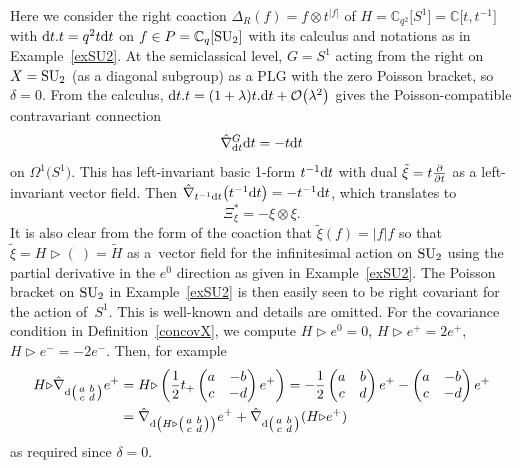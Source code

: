 \documentclass[pdftex]{sigma}
\numberwithin{equation}{section}
\newcommand{\C}{{\mathbb{C}}}
\newcommand{\<}{{\langle}}
\renewcommand{\>}{{\rangle}}
\newcommand{\tens}{\otimes}
\newcommand{\extd}{{\rm d}}
\newcommand{\del}{{\partial}}
\newcommand{\la}{{\triangleright}}
\begin{document}
\begin{Example}\label{exS2PB}
Here we consider the right coaction $\Delta_R(f)=f\tens t^{|f|}$ of $H=\C_{q^2}\big[S^1\big]=\C\big[t,t^{-1}\big]$ with $\extd t.t=q^2t\extd t$ on $f\in P=\C_q[{\rm SU}_2]$ with its calculus and notations as in Example~\ref{exSU2}. At the semiclassical level, $G=S^1$ acting from the right on $X={\rm SU}_2$ (as a diagonal subgroup) as a PLG with the zero Poisson bracket, so $\delta=0$. From the calculus, $\extd t.t=(1+{\lambda})t.\extd t+\mathcal{O}\big(\lambda^2\big)$ gives the Poisson-compatible contravariant connection
\begin{equation*}%
\hat\nabla^G_{\extd t}\extd t=-t\extd t\end{equation*}
on $\Omega^1\big(S^1\big)$. This has left-invariant basic 1-form $t^{-1}\extd t$ with dual $\tilde\xi=t{\del\over{\del t}}$ as a left-invariant vector field. Then $\hat\nabla_{t^{-1}\extd t}\big(t^{-1}\extd t\big)=-t^{-1}\extd t$, which translates to
\begin{equation}\label{conS2} \Xi_\xi^*=-\xi\tens\xi.\end{equation}
It is also clear from the form of the coaction that $\tilde{\xi}(f)=|f|f$ so that $\tilde\xi=H\la(\ )=\tilde H$ as a~vector field for the infinitesimal action on ${\rm SU}_2$ using the partial derivative in the $e^0$ direction as given in Example~\ref{exSU2}. The Poisson bracket on ${\rm SU}_2$ in Example~\ref{exSU2} is then easily seen to be right covariant for the action of~$S^1$. This is well-known and details are omitted.
For the covariance condition in Definition~\ref{concovX}, we compute $H\la e^0=0$, $H\la e^+=2e^+$, $H\la e^-=-2e^-$. Then, for example
\begin{align*}H\la\hat\nabla_{\extd\left(\begin{smallmatrix} a & b \\ c & d \end{smallmatrix}\right)}e^+&=H\la\left({1\over 2}t_+ \begin{pmatrix} a & -b \\ c & -d \end{pmatrix}e^+\right)=-{1\over 2} \begin{pmatrix} a & b \\ c & d \end{pmatrix}e^+- \begin{pmatrix} a & -b \\ c & -d \end{pmatrix}e^+\\
&=\hat\nabla_{\extd\left(H\la\left(\begin{smallmatrix} a & b \\ c & d \end{smallmatrix}\right)\right)}e^++\hat\nabla_{\extd\left(\begin{smallmatrix} a & b \\ c & d \end{smallmatrix}\right)}(H\la e^+)\end{align*}
as required since $\delta=0$. \end{Example}
\end{document}

